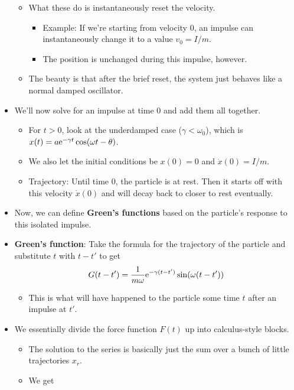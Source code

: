 \documentclass[../notes.tex]{subfiles}
\begin{document}
\begin{itemize}
\begin{itemize}
        \item What these do is instantaneously reset the velocity.
        \begin{itemize}
            \item Example: If we're starting from velocity 0, an impulse can instantaneously change it to a value $v_0=I/m$.
            \item The position is unchanged during this impulse, however.
        \end{itemize}
        \item The beauty is that after the brief reset, the system just behaves like a normal damped oscillator.
    \end{itemize}
    \item We'll now solve for an impulse at time 0 and add them all together.
    \begin{itemize}
        \item For $t>0$, look at the underdamped case ($\gamma<\omega_0$), which is $x(t)=a\e[-\gamma t]\cos(\omega t-\theta)$.
        \item We also let the initial conditions be $x(0)=0$ and $\dot{x}(0)=I/m$.
        \item Trajectory: Until time 0, the particle is at rest. Then it starts off with this velocity $\dot{x}(0)$ and will decay back to closer to rest eventually.
    \end{itemize}
    \item Now, we can define \textbf{Green's functions} based on the particle's response to this isolated impulse.
    \item \textbf{Green's function}: Take the formula for the trajectory of the particle and substitute $t$ with $t-t'$ to get
    \begin{equation*}
        G(t-t') = \frac{1}{m\omega}\e[-\gamma(t-t')]\sin(\omega(t-t'))
    \end{equation*}
    \begin{itemize}
        \item This is what will have happened to the particle some time $t$ after an impulse at $t'$.
    \end{itemize}
    \item We essentially divide the force function $F(t)$ up into calculus-style blocks.
    \begin{itemize}
        \item The solution to the series is basically just the sum over a bunch of little trajectories $x_r$.
        \item We get

\end{itemize}
\end{itemize}
\end{document}
